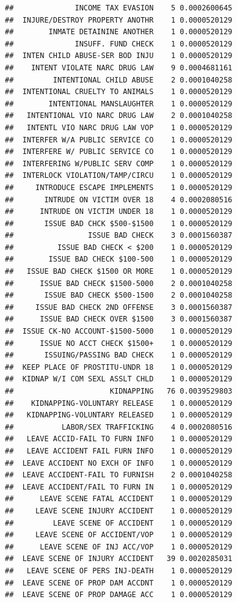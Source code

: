 \documentclass[]{book}
\begin{document}
\begin{verbatim}
##              INCOME TAX EVASION    5 0.0002600645
##  INJURE/DESTROY PROPERTY ANOTHR    1 0.0000520129
##        INMATE DETAININE ANOTHER    1 0.0000520129
##              INSUFF. FUND CHECK    1 0.0000520129
##  INTEN CHILD ABUSE-SER BOD INJU    1 0.0000520129
##    INTENT VIOLATE NARC DRUG LAW    9 0.0004681161
##         INTENTIONAL CHILD ABUSE    2 0.0001040258
##  INTENTIONAL CRUELTY TO ANIMALS    1 0.0000520129
##        INTENTIONAL MANSLAUGHTER    1 0.0000520129
##   INTENTIONAL VIO NARC DRUG LAW    2 0.0001040258
##   INTENTL VIO NARC DRUG LAW VOP    1 0.0000520129
##  INTERFER W/A PUBLIC SERVICE CO    1 0.0000520129
##  INTERFERE W/ PUBLIC SERVICE CO    1 0.0000520129
##  INTERFERING W/PUBLIC SERV COMP    1 0.0000520129
##  INTERLOCK VIOLATION/TAMP/CIRCU    1 0.0000520129
##     INTRODUCE ESCAPE IMPLEMENTS    1 0.0000520129
##       INTRUDE ON VICTIM OVER 18    4 0.0002080516
##      INTRUDE ON VICTIM UNDER 18    1 0.0000520129
##       ISSUE BAD CHCK $500-$1500    1 0.0000520129
##                 ISSUE BAD CHECK    3 0.0001560387
##          ISSUE BAD CHECK < $200    1 0.0000520129
##        ISSUE BAD CHECK $100-500    1 0.0000520129
##   ISSUE BAD CHECK $1500 OR MORE    1 0.0000520129
##      ISSUE BAD CHECK $1500-5000    2 0.0001040258
##       ISSUE BAD CHECK $500-1500    2 0.0001040258
##     ISSUE BAD CHECK 2ND OFFENSE    3 0.0001560387
##      ISSUE BAD CHECK OVER $1500    3 0.0001560387
##  ISSUE CK-NO ACCOUNT-$1500-5000    1 0.0000520129
##      ISSUE NO ACCT CHECK $1500+    1 0.0000520129
##       ISSUING/PASSING BAD CHECK    1 0.0000520129
##  KEEP PLACE OF PROSTITU-UNDR 18    1 0.0000520129
##  KIDNAP W/I COM SEXL ASSLT CHLD    1 0.0000520129
##                      KIDNAPPING   76 0.0039529803
##    KIDNAPPING-VOLUNTARY RELEASE    1 0.0000520129
##   KIDNAPPING-VOLUNTARY RELEASED    1 0.0000520129
##           LABOR/SEX TRAFFICKING    4 0.0002080516
##   LEAVE ACCID-FAIL TO FURN INFO    1 0.0000520129
##   LEAVE ACCIDENT FAIL FURN INFO    1 0.0000520129
##  LEAVE ACCIDENT NO EXCH OF INFO    1 0.0000520129
##  LEAVE ACCIDENT-FAIL TO FURNISH    2 0.0001040258
##  LEAVE ACCIDENT/FAIL TO FURN IN    1 0.0000520129
##      LEAVE SCENE FATAL ACCIDENT    1 0.0000520129
##     LEAVE SCENE INJURY ACCIDENT    1 0.0000520129
##         LEAVE SCENE OF ACCIDENT    1 0.0000520129
##     LEAVE SCENE OF ACCIDENT/VOP    1 0.0000520129
##      LEAVE SCENE OF INJ ACC/VOP    1 0.0000520129
##  LEAVE SCENE OF INJURY ACCIDENT   39 0.0020285031
##   LEAVE SCENE OF PERS INJ-DEATH    1 0.0000520129
##  LEAVE SCENE OF PROP DAM ACCDNT    1 0.0000520129
##  LEAVE SCENE OF PROP DAMAGE ACC    1 0.0000520129

\end{verbatim}
\end{document}
